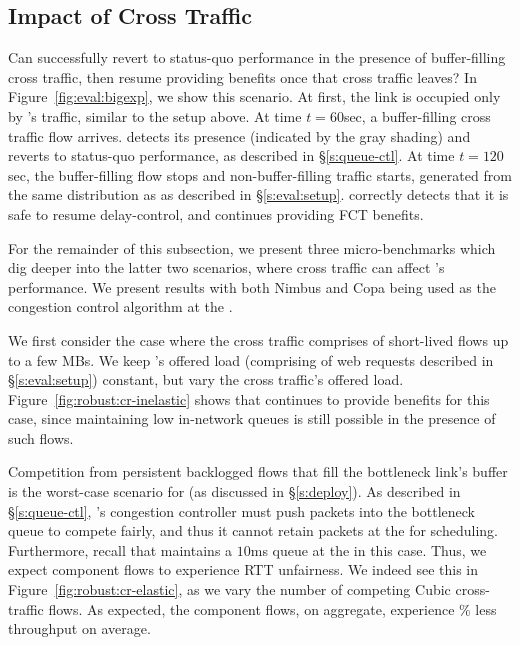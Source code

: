 \subsection{Impact of Cross Traffic}
\label{s:robust:cross}


Can \name successfully revert to status-quo performance in the presence of buffer-filling cross traffic, then resume providing benefits once that cross traffic leaves?
In Figure~\ref{fig:eval:bigexp}, we show this scenario.
At first, the link is occupied only by \name's traffic, similar to the setup above.
At time $t=60$sec, a buffer-filling cross traffic flow arrives.
\name detects its presence (indicated by the gray shading) and reverts to status-quo performance, as described in \S\ref{s:queue-ctl}.
At time $t=120$sec, the buffer-filling flow stops and non-buffer-filling traffic starts, generated from the same distribution as \name as described in \S\ref{s:eval:setup}.
\name correctly detects that it is safe to resume delay-control, and continues providing FCT benefits.

For the remainder of this subsection, we present three micro-benchmarks which dig deeper into the latter two scenarios, where cross traffic can affect \name's performance. 
We present results with both Nimbus and Copa being used as the congestion control algorithm at the \inbox.


 We first consider the case where the cross traffic comprises of short-lived flows up to a few MBs.
We keep \name's offered load (comprising of web requests described in \S\ref{s:eval:setup}) constant, but vary the cross traffic's offered load.
Figure~\ref{fig:robust:cr-inelastic} shows that \name continues to provide benefits for this case, since maintaining low in-network queues is still possible in the presence of such flows.


 Competition from persistent backlogged flows that fill the bottleneck link's buffer is the worst-case scenario for \name (as discussed in \S\ref{s:deploy}).
As described in \S\ref{s:queue-ctl}, \name's congestion controller must push packets into the bottleneck queue to compete fairly, and thus it cannot retain packets at the \inbox for scheduling. 
Furthermore, recall that \name maintains a $10$ms queue at the \inbox in this case. Thus, we expect component flows to experience RTT unfairness.
We indeed see this in Figure~\ref{fig:robust:cr-elastic}, as we vary the number of competing Cubic cross-traffic flows.
As expected, the component flows, on aggregate, experience \% less throughput on average.

